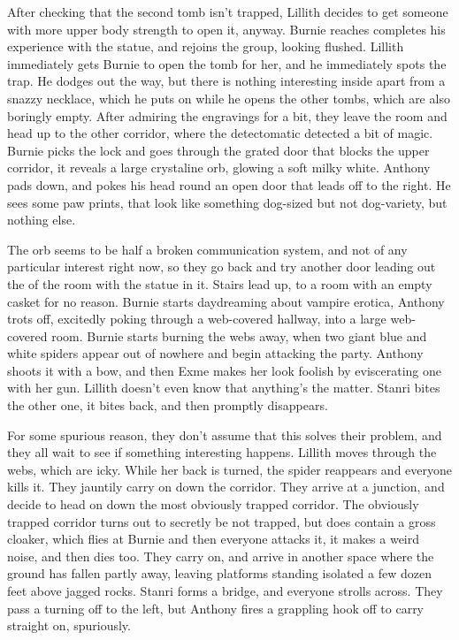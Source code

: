 After checking that the second tomb isn’t trapped, Lillith decides to get someone with more upper body strength to open it, anyway. Burnie reaches completes his experience with the statue, and rejoins the group, looking flushed. Lillith immediately gets Burnie to open the tomb for her, and he immediately spots the trap. He dodges out the way, but there is nothing interesting inside apart from a snazzy necklace, which he puts on while he opens the other tombs, which are also boringly empty. After admiring the engravings for a bit, they leave the room and head up to the other corridor, where the detectomatic detected a bit of magic. Burnie picks the lock and goes through the grated door that blocks the upper corridor, it reveals a large crystaline orb, glowing a soft milky white. Anthony pads down, and pokes his head round an open door that leads off to the right. He sees some paw prints, that look like something dog-sized but not dog-variety, but nothing else.\medskip

The orb seems to be half a broken communication system, and not of any particular interest right now, so they go back and try another door leading out the of the room with the statue in it. Stairs lead up, to a room with an empty casket for no reason. Burnie starts daydreaming about vampire erotica, Anthony trots off, excitedly poking through a web-covered hallway, into a large web-covered room. Burnie starts burning the webs away, when two giant blue and white spiders appear out of nowhere and begin attacking the party. Anthony shoots it with a bow, and then Exme makes her look foolish by eviscerating one with her gun. Lillith doesn’t even know that anything’s the matter. Stanri bites the other one, it bites back, and then promptly disappears.\medskip

For some spurious reason, they don’t assume that this solves their problem, and they all wait to see if something interesting happens. Lillith moves through the webs, which are icky. While her back is turned, the spider reappears and everyone kills it. They jauntily carry on down the corridor. They arrive at a junction, and decide to head on down the most obviously trapped corridor. The obviously trapped corridor turns out to secretly be not trapped, but does contain a gross cloaker, which flies at Burnie and then everyone attacks it, it makes a weird noise, and then dies too. They carry on, and arrive in another space where the ground has fallen partly away, leaving platforms standing isolated a few dozen feet above jagged rocks. Stanri forms a bridge, and everyone strolls across. They pass a turning off to the left, but Anthony fires a grappling hook off to carry straight on, spuriously.\medskip

